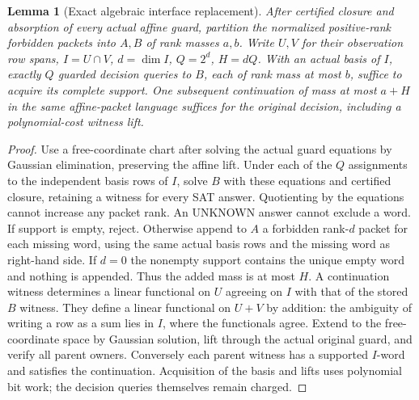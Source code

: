\documentclass[11pt]{article}
\newtheorem{lemma}[theorem]{Lemma}
\begin{document}
\begin{lemma}[Exact algebraic interface replacement]\label{lem:dp18-seam}
After certified closure and absorption of every actual affine guard, partition the normalized positive-rank forbidden packets into $A,B$ of rank masses $a,b$. Write $U,V$ for their observation row spans, $I=U\cap V$, $d=\dim I$, $Q=2^d$, $H=dQ$. With an actual basis of $I$, exactly $Q$ guarded decision queries to $B$, each of rank mass at most $b$, suffice to acquire its complete support. One subsequent continuation of mass at most $a+H$ in the same affine-packet language suffices for the original decision, including a polynomial-cost witness lift.
\end{lemma}
\begin{proof}
Use a free-coordinate chart after solving the actual guard equations by Gaussian elimination, preserving the affine lift. Under each of the $Q$ assignments to the independent basis rows of $I$, solve $B$ with these equations and certified closure, retaining a witness for every SAT answer. Quotienting by the equations cannot increase any packet rank. An UNKNOWN answer cannot exclude a word. If support is empty, reject. Otherwise append to $A$ a forbidden rank-$d$ packet for each missing word, using the same actual basis rows and the missing word as right-hand side. If $d=0$ the nonempty support contains the unique empty word and nothing is appended. Thus the added mass is at most $H$. A continuation witness determines a linear functional on $U$ agreeing on $I$ with that of the stored $B$ witness. They define a linear functional on $U+V$ by addition: the ambiguity of writing a row as a sum lies in $I$, where the functionals agree. Extend to the free-coordinate space by Gaussian solution, lift through the actual original guard, and verify all parent owners. Conversely each parent witness has a supported $I$-word and satisfies the continuation. Acquisition of the basis and lifts uses polynomial bit work; the decision queries themselves remain charged.
\end{proof}
\end{document}

